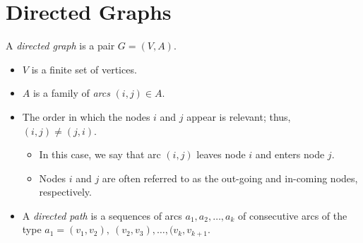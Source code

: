 \documentclass[12pt]{article}
\theoremstyle{definition}
\begin{document}
\section{Directed Graphs}
A \emph{directed graph} is a pair $G = (V, A)$.

\begin{itemize}
	\item $V$ is a finite set of vertices.
	\item $A$ is a family of \emph{arcs} $(i,j) \in A$.
	\item The order in which the nodes $i$ and $j$ appear is relevant; thus, $(i,j) \ne (j,i)$. 
	\begin{itemize}
		\item In this case, we say that arc $(i,j)$ leaves node $i$ and enters node $j$.
		\item Nodes $i$ and $j$ are often referred to as the out-going and in-coming nodes, respectively. 
	\end{itemize}
	\item A \emph{directed path} is a sequences of arcs $a_1, a_2, \dots, a_k$ of consecutive arcs of the type $a_1 = (v_1, v_2), \ (v_2,v_3), \dots, (v_k, v_{k+1}$. 
\end{itemize}
\end{document}
